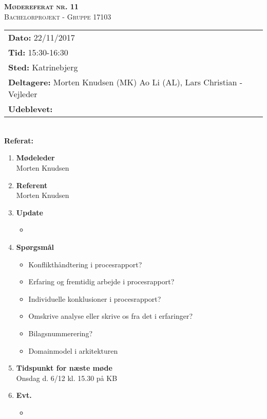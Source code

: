 
\newcommand{\HRule}{\rule{\linewidth}{0.1mm}}


	\begin{center}
		{\huge \bfseries \textsc{Mødereferat nr. 11}}\\
		\textsc{\large Bachelorprojekt - Gruppe 17103}\\[0.3cm]
	\end{center}
	\begin{tabular}{ll}
	\large \textbf{Dato:} 22/11/2017  	\\ %
	\large \textbf{Tid:}  15:30-16:30 	\\ %
	\large \textbf{Sted:} Katrinebjerg		\\ %
	\large \textbf{Deltagere:} Morten Knudsen (MK) Ao Li (AL), Lars Christian - Vejleder \\
	\large \textbf{Udeblevet:} 
	\end{tabular}\\
	\phantom{\,}\hspace{0.1em} \large \textbf{Referat:}
	\begin{enumerate}
		\itemsep 0.3em 
		\item \textbf{Mødeleder}\\
			Morten Knudsen
		\item \textbf{Referent}\\
			Morten Knudsen

		\item \textbf{Update}
			\begin{itemize}[-]
				\item 
				
			\end{itemize}
			
		\item \textbf{Spørgsmål}
			\begin{itemize}[-]
				\item Konflikthåndtering i procesrapport?
				\item Erfaring og fremtidig arbejde i procesrapport?
				\item Individuelle konklusioner i procesrapport?
				\item Omskrive analyse eller skrive os fra det i erfaringer?
				\item Bilagsnummerering?
				\item Domainmodel i arkitekturen
				
			\end{itemize}
	
		\item \textbf{Tidspunkt for næste møde} \\
			Onsdag d. 6/12 kl. 15.30 på KB
			
		\item \textbf{Evt.}
			\begin{itemize}[-]
				\item 
			\end{itemize}
			
	\end{enumerate}
